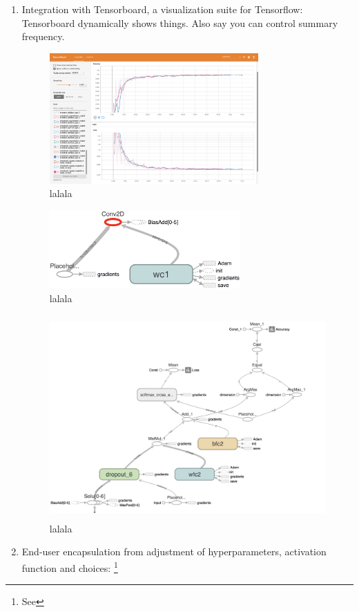 \documentclass[a4paper, 11pt]{article} %
\begin{document}
	\begin{enumerate}
		\item Integration with Tensorboard, a visualization suite for 
		Tensorflow: Tensorboard dynamically shows things. Also say you can 
		control summary frequency.
		\begin{figure}[H]
			\centering
			\includegraphics[height=5cm]{figures/tb_acc_loss}
			\caption{lalala}
		\end{figure}
		\begin{figure}[H]
			\centering
			\includegraphics[height=3cm]{figures/tb_graph_2}
			\caption{lalala}
		\end{figure}
		\begin{figure}[H]
			\centering
			\includegraphics[height=7.8cm]{figures/tb_graph_1}
			\caption{lalala}
		\end{figure}
		\item End-user encapsulation from adjustment of hyperparameters, 
		activation function and choices: \cite{selu-motivation} \footnote{See 
}
\end{enumerate}
\end{document}
